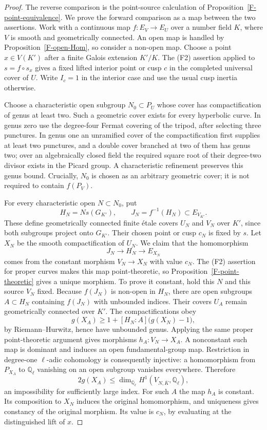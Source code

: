 \begin{proof}
The reverse comparison is the point-source calculation of
Proposition~\ref{F-point-equivalence}. We prove the forward
comparison as a map between the two assertions. Work with a
continuous map $f:E_V\to E_U$ over a number field $K$, where
$V$ is smooth and geometrically connected. An open map is
handled by Proposition~\ref{F-open-Hom}, so consider a
non-open map. Choose a point $x\in V(K')$ after a finite
Galois extension $K'/K$. The (F2) assertion applied to
$s=f\circ s_x$ gives a fixed lifted interior point or cusp
$c$ in the completed universal cover of $U$. Write $I_c=1$
in the interior case and use the usual cusp inertia otherwise.

Choose a characteristic open subgroup $N_0\subset P_U$ whose
cover has compactification of genus at least two. Such a
geometric cover exists for every hyperbolic curve. In genus
zero use the degree-four Fermat covering of the tripod, after
selecting three punctures. In genus one an unramified cover of
the compactification first supplies at least two punctures,
and a double cover branched at two of them has genus two;
over an algebraically closed field the required square root of
their degree-two divisor exists in the Picard group. A
characteristic refinement preserves this genus bound. Crucially,
$N_0$ is chosen as an arbitrary geometric cover; it is not
required to contain $f(P_V)$.

For every characteristic open $N\subset N_0$, put
\[
 H_N=N s(G_{K'}),\qquad J_N=f^{-1}(H_N)
       \subset E_{V_{K'}}.
\]
These define geometrically connected finite \'etale covers
$U_N$ and $V_N$ over $K'$, since both subgroups project onto
$G_{K'}$. Their chosen point or cusp $c_N$ is fixed by $s$.
Let $X_N$ be the smooth compactification of $U_N$.
We claim that the homomorphism
\[
 J_N\longrightarrow H_N\longrightarrow E_{X_N}
\]
comes from the constant morphism $V_N\to X_N$ with value
$c_N$. The (F2) assertion for proper curves makes this map
point-theoretic, so Proposition~\ref{F-point-theoretic} gives
a unique morphism. To prove it constant, hold this $N$ and
this source $V_N$ fixed. Because $f(J_N)$ is non-open in
$H_N$, there are open subgroups $A\subset H_N$ containing
$f(J_N)$ with unbounded indices. Their covers $U_A$ remain
geometrically connected over $K'$. The compactifications obey
\[
 g(X_A)\geq1+[H_N:A]\bigl(g(X_N)-1\bigr),
\]
by Riemann--Hurwitz, hence have unbounded genus. Applying the
same proper point-theoretic argument gives morphisms
$h_A:V_N\to X_A$. A nonconstant such map is dominant and
induces an open fundamental-group map. Restriction in
degree-one $\ell$-adic cohomology is consequently injective:
a homomorphism from $P_{X_A}$ to $\mathbb Q_\ell$ vanishing
on an open subgroup vanishes everywhere. Therefore
\[
 2g(X_A)\leq \dim_{\mathbb Q_\ell}
       H^1(V_{N,\overline K},\mathbb Q_\ell),
\]
an impossibility for sufficiently large index. For such $A$
the map $h_A$ is constant. Its composition to $X_N$ induces
the original homomorphism, and uniqueness gives constancy of
the original morphism. Its value is $c_N$, by evaluating at
the distinguished lift of $x$.


\end{proof}
